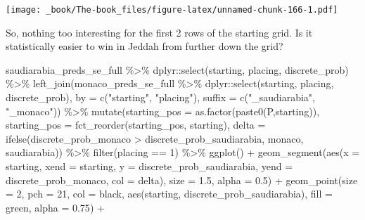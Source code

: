 \documentclass[
]{book}
\newenvironment{Shaded}{\begin{snugshade}}{\end{snugshade}}
\newcommand{\AttributeTok}[1]{\textcolor[rgb]{0.77,0.63,0.00}{#1}}
\newcommand{\DecValTok}[1]{\textcolor[rgb]{0.00,0.00,0.81}{#1}}
\newcommand{\FloatTok}[1]{\textcolor[rgb]{0.00,0.00,0.81}{#1}}
\newcommand{\FunctionTok}[1]{\textcolor[rgb]{0.00,0.00,0.00}{#1}}
\newcommand{\NormalTok}[1]{#1}
\newcommand{\SpecialCharTok}[1]{\textcolor[rgb]{0.00,0.00,0.00}{#1}}
\newcommand{\StringTok}[1]{\textcolor[rgb]{0.31,0.60,0.02}{#1}}
\begin{document}
\texttt{[image: \_book/The-book\_files/figure-latex/unnamed-chunk-166-1.pdf]}

So, nothing too interesting for the first 2 rows of the starting grid. Is it statistically easier to win in Jeddah from further down the grid?

\begin{Shaded}
\begin{Highlighting}[]
\NormalTok{saudiarabia\_preds\_se\_full }\SpecialCharTok{\%\textgreater{}\%}
\NormalTok{  dplyr}\SpecialCharTok{::}\FunctionTok{select}\NormalTok{(starting, placing, discrete\_prob) }\SpecialCharTok{\%\textgreater{}\%}
  \FunctionTok{left\_join}\NormalTok{(monaco\_preds\_se\_full }\SpecialCharTok{\%\textgreater{}\%}
\NormalTok{  dplyr}\SpecialCharTok{::}\FunctionTok{select}\NormalTok{(starting, placing, discrete\_prob), }\AttributeTok{by =} \FunctionTok{c}\NormalTok{(}\StringTok{"starting"}\NormalTok{, }\StringTok{"placing"}\NormalTok{), }\AttributeTok{suffix =} \FunctionTok{c}\NormalTok{(}\StringTok{"\_saudiarabia"}\NormalTok{, }\StringTok{"\_monaco"}\NormalTok{)) }\SpecialCharTok{\%\textgreater{}\%}
  \FunctionTok{mutate}\NormalTok{(}\AttributeTok{starting\_pos =} \FunctionTok{as.factor}\NormalTok{(}\FunctionTok{paste0}\NormalTok{(}\StringTok{\textquotesingle{}P\textquotesingle{}}\NormalTok{,starting)),}
         \AttributeTok{starting\_pos =} \FunctionTok{fct\_reorder}\NormalTok{(starting\_pos, starting),}
         \AttributeTok{delta =} \FunctionTok{ifelse}\NormalTok{(discrete\_prob\_monaco }\SpecialCharTok{\textgreater{}}\NormalTok{ discrete\_prob\_saudiarabia, }\StringTok{\textquotesingle{}monaco\textquotesingle{}}\NormalTok{, }\StringTok{\textquotesingle{}saudiarabia\textquotesingle{}}\NormalTok{)) }\SpecialCharTok{\%\textgreater{}\%}
  \FunctionTok{filter}\NormalTok{(placing }\SpecialCharTok{==} \DecValTok{1}\NormalTok{) }\SpecialCharTok{\%\textgreater{}\%}
  \FunctionTok{ggplot}\NormalTok{() }\SpecialCharTok{+}
  \FunctionTok{geom\_segment}\NormalTok{(}\FunctionTok{aes}\NormalTok{(}\AttributeTok{x =}\NormalTok{ starting, }\AttributeTok{xend =}\NormalTok{ starting, }\AttributeTok{y =}\NormalTok{ discrete\_prob\_saudiarabia, }\AttributeTok{yend =}\NormalTok{ discrete\_prob\_monaco, }\AttributeTok{col =}\NormalTok{ delta),}
               \AttributeTok{size =} \FloatTok{1.5}\NormalTok{, }\AttributeTok{alpha =} \FloatTok{0.5}\NormalTok{) }\SpecialCharTok{+}
  \FunctionTok{geom\_point}\NormalTok{(}\AttributeTok{size =} \DecValTok{2}\NormalTok{, }\AttributeTok{pch =} \DecValTok{21}\NormalTok{, }\AttributeTok{col =} \StringTok{\textquotesingle{}black\textquotesingle{}}\NormalTok{, }\FunctionTok{aes}\NormalTok{(starting, discrete\_prob\_saudiarabia), }\AttributeTok{fill =} \StringTok{\textquotesingle{}green\textquotesingle{}}\NormalTok{, }\AttributeTok{alpha =} \FloatTok{0.75}\NormalTok{) }\SpecialCharTok{+}

\end{Highlighting}
\end{Shaded}
\end{document}
